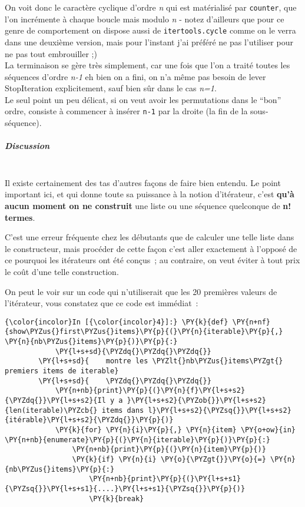     On voit donc le caractère cyclique d'ordre \emph{n} qui est matérialisé
par \texttt{counter}, que l'on incrémente à chaque boucle mais modulo
\emph{n} - notez d'ailleurs que pour ce genre de comportement on dispose
aussi de \texttt{itertools.cycle} comme on le verra dans une deuxième
version, mais pour l'instant j'ai préféré ne pas l'utiliser pour ne pas
tout embrouiller ;)\\

La terminaison se gère très simplement, car une fois que l'on a traité
toutes les séquences d'ordre \emph{n-1} eh bien on a fini, on n'a même
pas besoin de lever StopIteration explicitement, sauf bien sûr dans le
cas \emph{n=1}.\\

Le seul point un peu délicat, si on veut avoir les permutations dans le
``bon'' ordre, consiste à commencer à insérer \texttt{n-1} par la droite
(la fin de la sous-séquence).

    \hypertarget{discussion}{%
\subparagraph{Discussion\\\\}\label{discussion}}

    Il existe certainement des tas d'autres façons de faire bien entendu. Le
point important ici, et qui donne toute sa puissance à la notion
d'itérateur, c'est \textbf{qu'à aucun moment on ne construit} une liste
ou une séquence quelconque de \textbf{n! termes}.

C'est une erreur fréquente chez les débutants que de calculer une telle
liste dans le constructeur, mais procéder de cette façon c'est aller
exactement à l'opposé de ce pourquoi les itérateurs ont été conçus~; au
contraire, on veut éviter à tout prix le coût d'une telle construction.

On peut le voir sur un code qui n'utiliserait que les 20 premières
valeurs de l'itérateur, vous constatez que ce code est immédiat~:

    \begin{Verbatim}[commandchars=\\\{\}]
{\color{incolor}In [{\color{incolor}4}]:} \PY{k}{def} \PY{n+nf}{show\PYZus{}first\PYZus{}items}\PY{p}{(}\PY{n}{iterable}\PY{p}{,} \PY{n}{nb\PYZus{}items}\PY{p}{)}\PY{p}{:}
            \PY{l+s+sd}{\PYZdq{}\PYZdq{}\PYZdq{}}
        \PY{l+s+sd}{    montre les \PYZlt{}nb\PYZus{}items\PYZgt{} premiers items de iterable}
        \PY{l+s+sd}{    \PYZdq{}\PYZdq{}\PYZdq{}}
            \PY{n+nb}{print}\PY{p}{(}\PY{n}{f}\PY{l+s+s2}{\PYZdq{}}\PY{l+s+s2}{Il y a }\PY{l+s+s2}{\PYZob{}}\PY{l+s+s2}{len(iterable)\PYZcb{} items dans l}\PY{l+s+s2}{\PYZsq{}}\PY{l+s+s2}{itérable}\PY{l+s+s2}{\PYZdq{}}\PY{p}{)}
            \PY{k}{for} \PY{n}{i}\PY{p}{,} \PY{n}{item} \PY{o+ow}{in} \PY{n+nb}{enumerate}\PY{p}{(}\PY{n}{iterable}\PY{p}{)}\PY{p}{:}
                \PY{n+nb}{print}\PY{p}{(}\PY{n}{item}\PY{p}{)}
                \PY{k}{if} \PY{n}{i} \PY{o}{\PYZgt{}}\PY{o}{=} \PY{n}{nb\PYZus{}items}\PY{p}{:}
                    \PY{n+nb}{print}\PY{p}{(}\PY{l+s+s1}{\PYZsq{}}\PY{l+s+s1}{....}\PY{l+s+s1}{\PYZsq{}}\PY{p}{)}
                    \PY{k}{break}
\end{Verbatim}


